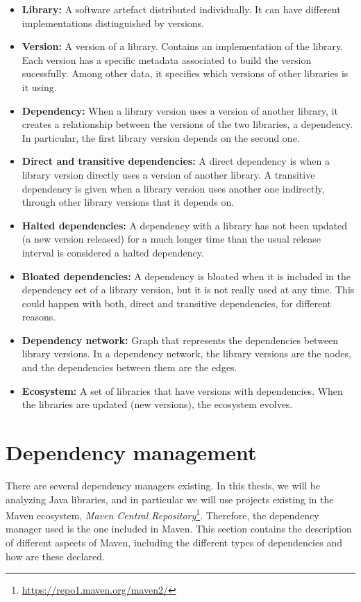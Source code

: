 \begin{itemize}
  \item \textbf{Library:} A software artefact distributed individually. It can have different implementations distinguished by versions.

  \item \textbf{Version:} A version of a library. Contains an implementation of the library. Each version has a specific metadata associated to build the version sucessfully. Among other data, it specifies which versions of other libraries is it using.

  \item \textbf{Dependency:} When a library version uses a version of another library, it creates a relationship between the versions of the two libraries, a dependency. In particular, the first library version depends on the second one.

  \item \textbf{Direct and transitive dependencies:} A direct dependency is when a library version directly uses a version of another library. A transitive dependency is given when a library version uses another one indirectly, through other library versions that it depends on.

  \item \textbf{Halted dependencies:} A dependency with a library has not been updated (a new version released) for a much longer time than the usual release interval is considered a halted dependency.

  \item \textbf{Bloated dependencies:} A dependency is bloated when it is included in the dependency set of a library version, but it is not really used at any time. This could happen with both, direct and transitive dependencies, for different reasons.

  \item \textbf{Dependency network:} Graph that represents the dependencies between library versions. In a dependency network, the library versions are the nodes, and the dependencies between them are the edges.

  \item \textbf{Ecosystem:} A set of libraries that have versions with dependencies. When the libraries are updated (new versions), the ecosystem evolves.
\end{itemize}

\section{Dependency management}
There are several dependency managers existing. In this thesis, we will be analyzing Java libraries, and in particular we will use projects existing in the Maven ecosystem, \textit{Maven Central Repository}\footnote{\url{https://repo1.maven.org/maven2/}}. Therefore, the dependency manager used is the one included in Maven. This section contains the description of different aspects of Maven, including the different types of dependencies and how are these declared.

